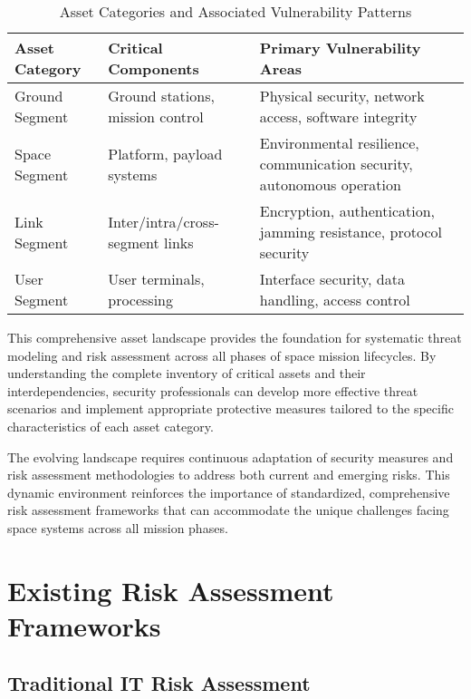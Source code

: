 \documentclass[binding=0.6cm]{sapthesis}
\begin{document}
\begin{table}[H]
\centering
\caption{Asset Categories and Associated Vulnerability Patterns}
\begin{tabular}{|l|l|l|}
\hline
\textbf{Asset Category} & \textbf{Critical Components} & \textbf{Primary Vulnerability Areas} \\ \hline
Ground Segment & Ground stations, mission control & Physical security, network access, software integrity \\ \hline
Space Segment & Platform, payload systems & Environmental resilience, communication security, autonomous operation \\ \hline
Link Segment & Inter/intra/cross-segment links & Encryption, authentication, jamming resistance, protocol security \\ \hline
User Segment & User terminals, processing & Interface security, data handling, access control \\ \hline
\end{tabular}
\end{table}

This comprehensive asset landscape provides the foundation for systematic threat modeling and risk assessment across all phases of space mission lifecycles. By understanding the complete inventory of critical assets and their interdependencies, security professionals can develop more effective threat scenarios and implement appropriate protective measures tailored to the specific characteristics of each asset category.

\vspace{13pt}
The evolving landscape requires continuous adaptation of security measures and risk assessment methodologies to address both current and emerging risks. This dynamic environment reinforces the importance of standardized, comprehensive risk assessment frameworks that can accommodate the unique challenges facing space systems across all mission phases.

\section{Existing Risk Assessment Frameworks}

\subsection{Traditional IT Risk Assessment}
\end{document}
